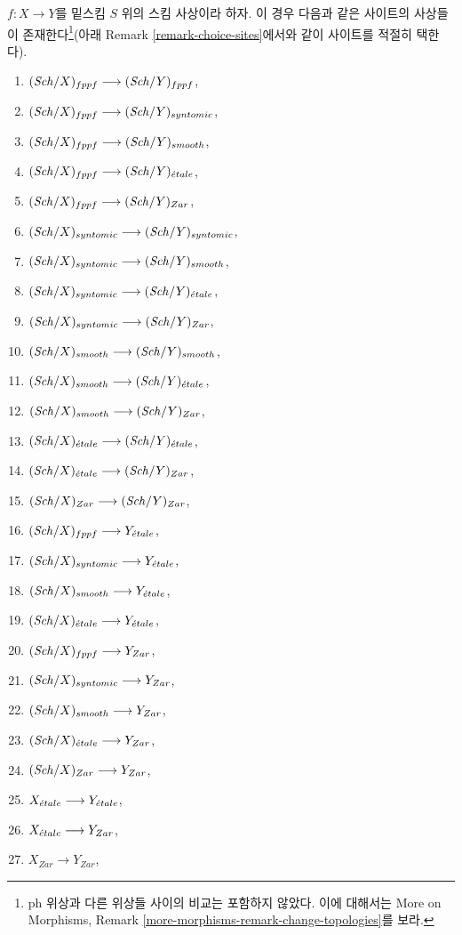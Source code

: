 \noindent
$f : X \to Y$를 밑스킴 $S$ 위의 스킴 사상이라 하자. 이 경우 다음과 같은
사이트의 사상들이 존재한다\footnote{ph 위상과 다른 위상들 사이의 비교는
포함하지 않았다. 이에 대해서는 More on Morphisms, Remark
\ref{more-morphisms-remark-change-topologies}를 보라.}(아래 Remark
\ref{remark-choice-sites}에서와 같이 사이트를 적절히 택한다).
\begin{enumerate}
\item $(\mathit{Sch}/X)_{fppf} \longrightarrow (\mathit{Sch}/Y)_{fppf}$,
\item $(\mathit{Sch}/X)_{fppf} \longrightarrow (\mathit{Sch}/Y)_{syntomic}$,
\item $(\mathit{Sch}/X)_{fppf} \longrightarrow (\mathit{Sch}/Y)_{smooth}$,
\item $(\mathit{Sch}/X)_{fppf} \longrightarrow
(\mathit{Sch}/Y)_{\acute{e}tale}$,
\item $(\mathit{Sch}/X)_{fppf} \longrightarrow (\mathit{Sch}/Y)_{Zar}$,
\item $(\mathit{Sch}/X)_{syntomic} \longrightarrow (\mathit{Sch}/Y)_{syntomic}$,
\item $(\mathit{Sch}/X)_{syntomic} \longrightarrow (\mathit{Sch}/Y)_{smooth}$,
\item $(\mathit{Sch}/X)_{syntomic} \longrightarrow
(\mathit{Sch}/Y)_{\acute{e}tale}$,
\item $(\mathit{Sch}/X)_{syntomic} \longrightarrow (\mathit{Sch}/Y)_{Zar}$,
\item $(\mathit{Sch}/X)_{smooth} \longrightarrow (\mathit{Sch}/Y)_{smooth}$,
\item $(\mathit{Sch}/X)_{smooth} \longrightarrow
(\mathit{Sch}/Y)_{\acute{e}tale}$,
\item $(\mathit{Sch}/X)_{smooth} \longrightarrow (\mathit{Sch}/Y)_{Zar}$,
\item $(\mathit{Sch}/X)_{\acute{e}tale} \longrightarrow
(\mathit{Sch}/Y)_{\acute{e}tale}$,
\item $(\mathit{Sch}/X)_{\acute{e}tale} \longrightarrow (\mathit{Sch}/Y)_{Zar}$,
\item $(\mathit{Sch}/X)_{Zar} \longrightarrow (\mathit{Sch}/Y)_{Zar}$,
\item $(\mathit{Sch}/X)_{fppf} \longrightarrow Y_{\acute{e}tale}$,
\item $(\mathit{Sch}/X)_{syntomic} \longrightarrow Y_{\acute{e}tale}$,
\item $(\mathit{Sch}/X)_{smooth} \longrightarrow Y_{\acute{e}tale}$,
\item $(\mathit{Sch}/X)_{\acute{e}tale} \longrightarrow Y_{\acute{e}tale}$,
\item $(\mathit{Sch}/X)_{fppf} \longrightarrow Y_{Zar}$,
\item $(\mathit{Sch}/X)_{syntomic} \longrightarrow Y_{Zar}$,
\item $(\mathit{Sch}/X)_{smooth} \longrightarrow Y_{Zar}$,
\item $(\mathit{Sch}/X)_{\acute{e}tale} \longrightarrow Y_{Zar}$,
\item $(\mathit{Sch}/X)_{Zar} \longrightarrow Y_{Zar}$,
\item $X_{\acute{e}tale} \longrightarrow Y_{\acute{e}tale}$,
\item $X_{\acute{e}tale} \longrightarrow Y_{Zar}$,
\item $X_{Zar} \longrightarrow Y_{Zar}$,
\end{enumerate}

